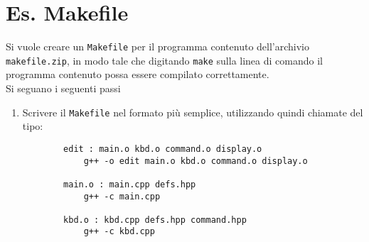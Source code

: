 \section*{Es. Makefile}
Si vuole creare un \texttt{Makefile} per il programma contenuto dell'archivio \texttt{makefile.zip}, in modo tale che digitando \texttt{make} sulla linea di comando il programma contenuto possa essere compilato correttamente.\\
Si seguano i seguenti passi
\begin{enumerate}
	\item Scrivere il \texttt{Makefile} nel formato pi\`u semplice, utilizzando quindi chiamate del tipo:
	\begin{verbatim}
		edit : main.o kbd.o command.o display.o
	        g++ -o edit main.o kbd.o command.o display.o
	        
		main.o : main.cpp defs.hpp
	        g++ -c main.cpp
	        
		kbd.o : kbd.cpp defs.hpp command.hpp
    	    g++ -c kbd.cpp
    	    

\end{verbatim}
\end{enumerate}
